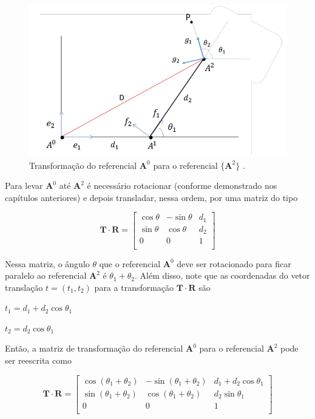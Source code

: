 \begin{figure}[H]
	\centering
	\includegraphics[scale=0.80]{a_robo5.png}
	\caption{Transformação do referencial $\mathbf{A}^0$ para o referencial $\{\mathbf{A}^2\}$ \cite{sirlandro2017}.}
\end{figure} 

Para levar $\mathbf{A}^0$ até $\mathbf{A}^2$ é necessário rotacionar (conforme demonstrado nos capítulos anteriores) e depois transladar, nessa ordem, por uma matriz do tipo

\[
\mathbf{T}\cdot\mathbf{R} = \begin{bmatrix}
	\cos\theta & -\sin\theta & d_1\\
	\sin\theta & \cos\theta & d_2\\
	0 & 0 & 1\\
\end{bmatrix}
\]

Nessa matriz, o ângulo $\theta$ que o referencial $\mathbf{A}^0$ deve ser rotacionado para ficar paralelo ao referencial $\mathbf{A}^2$ é $\theta_1 + \theta_2$. Além disso, note que as coordenadas do vetor translação $t = (t_1, t_2)$ para a transformação $\mathbf{T}\cdot\mathbf{R}$ são

\centerline{$t_1 = d_1 + d_2\cos\theta_1$}

\centerline{$t_2 = d_2\cos\theta_1$}

Então, a matriz de transformação do referencial $\mathbf{A}^0$ para o referencial $\mathbf{A}^2$ pode ser reescrita como 

\[
\mathbf{T}\cdot\mathbf{R} = \begin{bmatrix}
	\cos(\theta_1 + \theta_2) & -\sin(\theta_1 + \theta_2) & d_1 + d_2\cos\theta_1\\
	\sin(\theta_1 + \theta_2) & \cos(\theta_1 + \theta_2) & d_2\sin\theta_1\\
	0 & 0 & 1\\
\end{bmatrix}
\]

